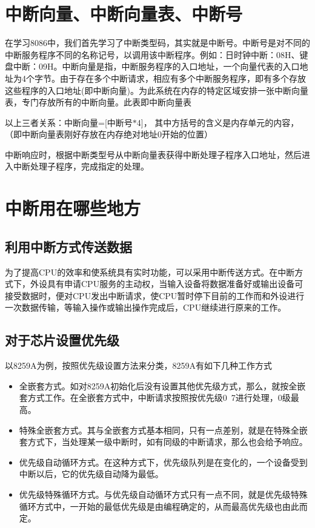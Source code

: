 \documentclass[UTF8]{ctexart}
\begin{document}
\section{中断向量、中断向量表、中断号}
在学习8086中，我们首先学习了中断类型码，其实就是中断号。中断号是对不同的中断服务程序不同的名称记号，以调用该中断程序。例如：日时钟中断：08H、键盘中断：09H。中断向量是指，中断服务程序的入口地址，一个向量代表的入口地址为4个字节。由于存在多个中断请求，相应有多个中断服务程序，即有多个存放这些程序的入口地址(即中断向量)。为此系统在内存的特定区域安排一张中断向量表，专门存放所有的中断向量。此表即中断向量表\par
以上三者关系：中断向量=[中断号$*$4]， 其中方括号的含义是内存单元的内容，（即中断向量表刚好存放在内存绝对地址0开始的位置）\par
中断响应时，根据中断类型号从中断向量表获得中断处理子程序入口地址，然后进入中断处理子程序，完成指定的处理。\par
\section{中断用在哪些地方}
\subsection{利用中断方式传送数据}
为了提高CPU的效率和使系统具有实时功能，可以采用中断传送方式。在中断方式下，外设具有申请CPU服务的主动权，当输入设备将数据准备好或输出设备可接受数据时，便对CPU发出中断请求，使CPU暂时停下目前的工作而和外设进行一次数据传输，等输入操作或输出操作完成后，CPU继续进行原来的工作。
\subsection{对于芯片设置优先级}
以8259A为例，按照优先级设置方法来分类，8259A有如下几种工作方式
\begin{itemize}
  \item 全嵌套方式。如对8259A初始化后没有设置其他优先级方式，那么，就按全嵌套方式工作。在全嵌套方式中，中断请求按照按优先级0~7进行处理，0级最高。
  \item 特殊全嵌套方式。其与全嵌套方式基本相同，只有一点差别，就是在特殊全嵌套方式下，当处理某一级中断时，如有同级的中断请求，那么也会给予响应。
  \item 优先级自动循环方式。在这种方式下，优先级队列是在变化的，一个设备受到中断以后，它的优先级自动降为最低。
  \item 优先级特殊循环方式。与优先级自动循环方式只有一点不同，就是优先级特殊循环方式中，一开始的最低优先级是由编程确定的，从而最高优先级也由此而定。
\end{itemize}
\end{document}
